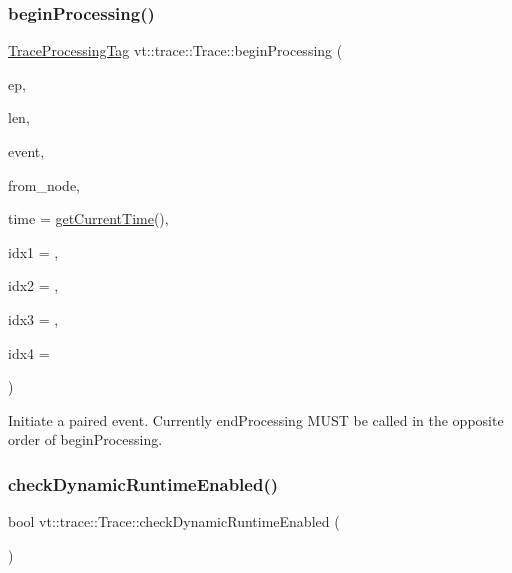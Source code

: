 \subsubsection{\texorpdfstring{begin\+Processing()}{beginProcessing()}}
{\footnotesize\ttfamily \hyperlink{structvt_1_1trace_1_1_trace_processing_tag}{Trace\+Processing\+Tag} vt\+::trace\+::\+Trace\+::begin\+Processing (\begin{DoxyParamCaption}\item[{\hyperlink{namespacevt_1_1trace_a3c14050715ba9eceaeff51fb3de64f2f}{Trace\+Entry\+I\+D\+Type} const}]{ep,  }\item[{\hyperlink{namespacevt_1_1trace_aeb598f45d67d41db7902e494f2f0ce59}{Trace\+Msg\+Len\+Type} const}]{len,  }\item[{\hyperlink{namespacevt_1_1trace_a64a7185f3e102df8d8258f263ccd1582}{Trace\+Event\+I\+D\+Type} const}]{event,  }\item[{\hyperlink{namespacevt_a866da9d0efc19c0a1ce79e9e492f47e2}{Node\+Type} const}]{from\+\_\+node,  }\item[{double const}]{time = {\ttfamily \hyperlink{structvt_1_1trace_1_1_trace_a04cf6b76b4ced1bc90d246a34c948db5}{get\+Current\+Time}()},  }\item[{uint64\+\_\+t const}]{idx1 = {},  }\item[{uint64\+\_\+t const}]{idx2 = {},  }\item[{uint64\+\_\+t const}]{idx3 = {},  }\item[{uint64\+\_\+t const}]{idx4 = {} }\end{DoxyParamCaption})}

Initiate a paired event. Currently end\+Processing M\+U\+ST be called in the opposite order of begin\+Processing. \mbox{\label{structvt_1_1trace_1_1_trace_a4b911a4f90a4b6b76c03341db7d94fdd}} 
\subsubsection{\texorpdfstring{check\+Dynamic\+Runtime\+Enabled()}{checkDynamicRuntimeEnabled()}}
{\footnotesize\ttfamily bool vt\+::trace\+::\+Trace\+::check\+Dynamic\+Runtime\+Enabled (\begin{DoxyParamCaption}{ }\end{DoxyParamCaption})}

